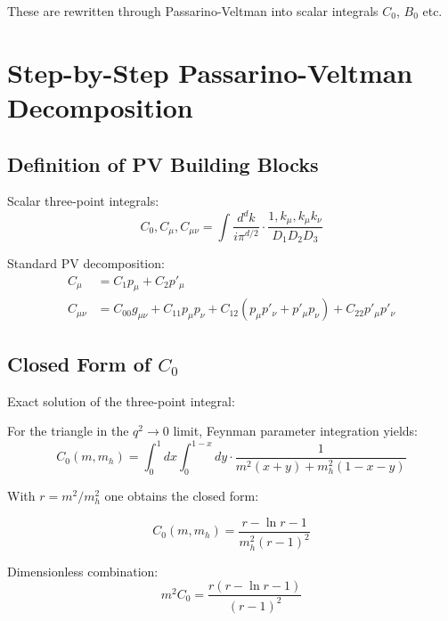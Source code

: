 	These are rewritten through Passarino-Veltman into scalar integrals $C_0$, $B_0$ etc.
	
	\section{Step-by-Step Passarino-Veltman Decomposition}
	
	\subsection{Definition of PV Building Blocks}
	
	\begin{pvbox}
		Scalar three-point integrals:
		\begin{equation}
			C_0, C_\mu, C_{\mu\nu} = \int \frac{d^d k}{i\pi^{d/2}} \cdot \frac{1, k_\mu, k_\mu k_\nu}{D_1 D_2 D_3}
		\end{equation}
		
		Standard PV decomposition:
		\begin{align}
			C_\mu &= C_1 p_\mu + C_2 p'_\mu\\
			C_{\mu\nu} &= C_{00} g_{\mu\nu} + C_{11} p_\mu p_\nu + C_{12}(p_\mu p'_\nu + p'_\mu p_\nu) + C_{22} p'_\mu p'_\nu
		\end{align}
	\end{pvbox}
	
	\subsection{Closed Form of $C_0$}
	
	\begin{pvbox}
		Exact solution of the three-point integral:
		
		For the triangle in the $q^2 \to 0$ limit, Feynman parameter integration yields:
		\begin{equation}
			C_0(m, m_h) = \int_0^1 dx \int_0^{1-x} dy \cdot \frac{1}{m^2(x+y) + m_h^2(1-x-y)}
		\end{equation}
		
		With $r = m^2/m_h^2$ one obtains the closed form:
		
		\begin{equation}
			C_0(m, m_h) = \frac{r - \ln r - 1}{m_h^2(r-1)^2}
		\end{equation}
		
		Dimensionless combination:
		\begin{equation}
			m^2C_0 = \frac{r(r - \ln r - 1)}{(r-1)^2}
		\end{equation}
	\end{pvbox}
	
